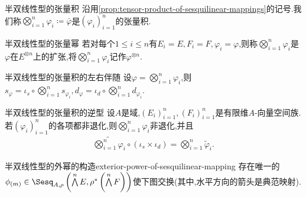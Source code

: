 \begin{definition}{半双线性型的张量积}{}
	沿用\cref{prop:tensor-product-of-sesquilinear-mappings}的记号.我们称$\bigotimes\limits_{i=1}^{n}\varphi_{i}\coloneq\bar{\varphi}$是$\left(\varphi_{i}\right)_{i=1}^{n}$的张量积.
\end{definition}

\begin{definition}{半双线性型的张量幂}{}
	若对每个$1\leq i\leq n$有$E_{i}=E,F_{i}=F,\varphi_{i}=\varphi$,则称$\bigotimes\limits_{i=1}^{n}\varphi_{i}$是$\varphi$在$E^{\otimes n}$上的扩张,将$\bigotimes\limits_{i=1}^{n}\varphi_{i}$记作$\varphi^{\otimes n}$.
\end{definition}

\begin{proposition}{半双线性型的张量积的左右伴随}{}
	设$\varphi=\bigotimes\limits_{i=1}^{n}\varphi_{i}$,则$s_{\varphi}=\iota_{s}\circ\bigotimes\limits_{i=1}^{n}s_{\varphi_{i}},d_{\varphi}=\iota_{d}\circ\bigotimes\limits_{i=1}^{n}d_{\varphi_{i}}$.
\end{proposition}

\begin{proposition}{半双线性型的张量积的逆型}{}
	设$A$是域,$\left(E_{i}\right)_{i=1}^{n},\left(F_{i}\right)_{i=1}^{n}$是有限维$A$-向量空间族.若$\left(\varphi_{i}\right)_{i=1}^{n}$的各项都非退化,则$\bigotimes\limits_{i=1}^{n}\varphi_{i}$非退化,并且
	\begin{align*}
		\widetilde{\bigotimes\limits_{i=1}^{n}\varphi_{i}}\circ\left(\iota_{s}\times\iota_{d}\right)=\bigotimes\limits_{i=1}^{n}\tilde{\varphi}_{i}.
	\end{align*}
\end{proposition}

\begin{proposition}{半双线性型的外幂的构造}{exterior-power-of-sesquilinear-mapping}
	存在唯一的$\phi_{\left(m\right)}\in\Sesq_{A,\rho}\left(\bigwedge\limits^{n}E,\rho^{\ast}\left(\bigwedge\limits^{n}F\right)\right)$使下图交换(其中,水平方向的箭头是典范映射).
	\begin{center}
	\end{center}
\end{proposition}


